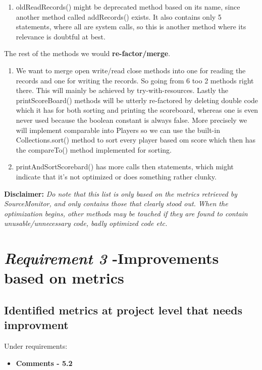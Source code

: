 \documentclass{article}
\begin{document}
\begin{enumerate}
\begin{enumerate}
\item
oldReadRecords() might be deprecated method based on its name, since another method called addRecords() exists. It also contains only 5 statements, where all are system calls, so this is another method where its relevance is doubtful at best.
\end{enumerate}
\vspace{0.4cm}
The rest of the methods we would \textbf{re-factor/merge}.
\vspace{0.2cm}
\begin{enumerate}
\item
We want to merge open write/read close methods into one for
reading the records and one for writing the records. So going from 6
too 2 methods right there. This will mainly be achieved by try-with-resources.
Lastly the printScoreBoard() methods will be utterly re-factored by deleting
double code which it has for both sorting and printing the scoreboard, whereas one is even never used because the boolean constant is always false. More precisely we will implement comparable into Players so we can use the built-in Collections.sort() method to sort every player based om score which then has the compareTo() method implemented for sorting.

\item
printAndSortScorebard() has more calls then statements, which might indicate that it's not optimized or does something rather clunky.

\end{enumerate}

\textbf{Disclaimer:} \hspace{0.2cm} 
\textit{Do note that this list is only based on the metrics retrieved by SourceMonitor, and only contains those that clearly stood out. When the optimization begins, other methods may be touched if they are found to contain unusable/unnecessary code, badly optimized code etc.}

\end{enumerate}



\section{\textit{Requirement 3} -Improvements based on metrics}

\subsection{Identified metrics at project level that needs improvment}
Under requirements:
\begin{itemize}
\item
\textbf{Comments - 5.2}
\end{itemize}
\end{document}
